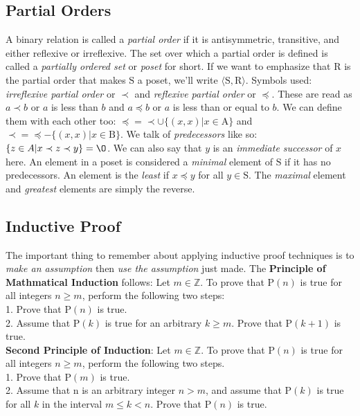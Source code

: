 \documentclass[10pt,twocolumn, letterpaper]{article}
\begin{document}
\subsection*{Partial Orders}
A binary relation is called a \textit{partial order} if it is antisymmetric, transitive, and either reflexive or irreflexive. 
The set over which a partial order is defined is called a \textit{partially ordered set} or \textit{poset} for short. If we want to 
emphasize that $\mathrm{R}$ is the partial order that makes $\mathrm{S}$ a poset, we'll write $\langle \mathrm{S},\mathrm{R} \rangle$. 
Symbols used: \textit{irreflexive partial order} or $\prec$ and \textit{reflexive partial order} or $\preceq$. 
These are read as $a \prec b$ or $a$ is less than $b$ and $a \preceq b$ or $a$ is less than or equal to $b$.
We can define them with each other too: $\preceq = \prec \cup \lbrace (x,x) \vert x \in \mathrm{A}\rbrace$ and 
$\prec = \preceq - \lbrace(x,x) \vert x \in \mathrm{B}\rbrace$. We talk of \textit{predecessors} like so: $\lbrace z \in A \vert x \prec z \prec y \rbrace = \O$.
We can also say that $y$ is an \textit{immediate successor} of $x$ here. An element in a poset is considered a \textit{minimal} element of $\mathrm{S}$ if it has no
predecessors. An element is the \textit{least} if $x \preceq y$ for all $y \in \mathrm{S}$. The \textit{maximal} element and \textit{greatest} elements are
simply the reverse. 

\subsection*{Inductive Proof}
The important thing to remember about applying inductive proof techniques is to \textit{make an assumption} then \textit{use the assumption} just made.
The \textbf{Principle of Mathmatical Induction} follows: Let $m \in \mathbb{Z}$. To prove that $\mathrm{P}(n)$ is true for all integers $n \geq m$, 
perform the following two steps: \\
1. Prove that $\mathrm{P}(n)$ is true.\\
2. Assume that $\mathrm{P}(k)$ is true for an arbitrary $k \geq m$. Prove that $\mathrm{P}(k + 1)$ is true.\\
\textbf{Second Principle of Induction}: Let $m \in \mathbb{Z}$. To prove that $\mathrm{P}(n)$ is true for all integers $n \geq m$, perform the following
two steps.\\
1. Prove that $\mathrm{P}(m)$ is true.\\
2. Assume that n is an arbitrary integer $n > m$, and assume that $\mathrm{P}(k)$ is true for all $k$ in the interval $m \leq k < n$. Prove that $\mathrm{P}(n)$ is true.
\end{document}
